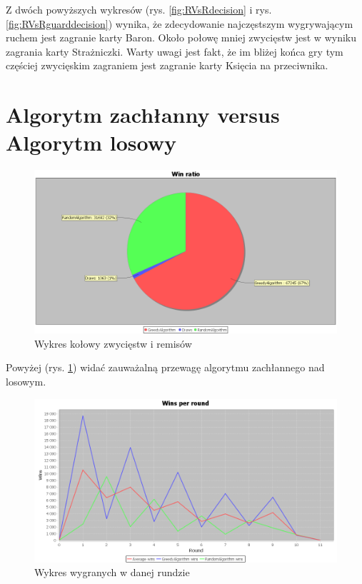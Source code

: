 Z dwóch powyższych wykresów (rys. \ref{fig:RVsRdecision} i rys. \ref{fig:RVsRguarddecision}) wynika, że zdecydowanie najczęstszym wygrywającym ruchem jest zagranie karty Baron. Około połowę mniej zwycięstw jest w wyniku zagrania karty Strażniczki. Warty uwagi jest fakt, że im bliżej końca gry tym częściej zwycięskim zagraniem jest zagranie karty Księcia na przeciwnika.

\clearpage
\section{Algorytm zachłanny versus Algorytm losowy}

\begin{figure}[H]
	\centering
	\includegraphics[width=\textwidth]{Resources/GVsR/GVsRwin.PNG}
	\caption{Wykres kołowy zwycięstw i remisów} 
	\label{fig:GVsRwin}
\end{figure}

Powyżej (rys. \ref{fig:GVsRwin}) widać zauważalną przewagę algorytmu zachłannego nad losowym.

\begin{figure}[H]
	\centering
	\includegraphics[width=\textwidth]{Resources/GVsR/GVsRroundwin.PNG}
	\caption{Wykres wygranych w danej rundzie} 
	\label{fig:GVsRroundwin}
\end{figure}

